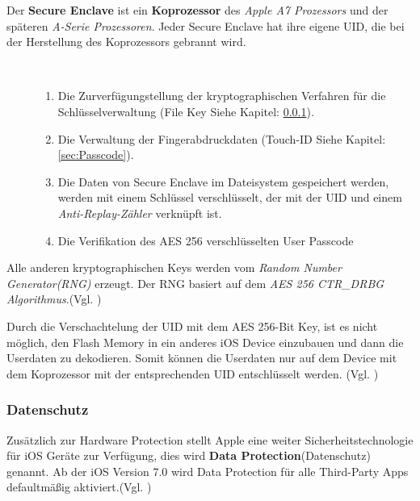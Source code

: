 Der \textbf{Secure Enclave} ist ein \textbf{Koprozessor} des \textit{\glqq Apple A7 Prozessors\grqq{}} und der späteren \textit{\glqq A-Serie Prozessoren\grqq}. Jeder Secure Enclave hat ihre eigene UID, die bei der Herstellung des Koprozessors gebrannt wird.

\begin{description}
     \item[\parbox{\textwidth} {Die Secure Enclace hat folgende Aufgaben}]~\par
    \begin{enumerate}
        \item Die Zurverfügungstellung der kryptographischen Verfahren für die Schlüsselverwaltung (File Key Siehe Kapitel: \ref{sec:DataProtection}).
       \item Die Verwaltung der Fingerabdruckdaten (Touch-ID Siehe Kapitel: \ref{sec:Passcode}).
       \item Die Daten von Secure Enclave im Dateisystem gespeichert werden, werden mit einem Schlüssel verschlüsselt, der mit der UID und einem \textit{\glqq Anti-Replay-Zähler\grqq{}} verknüpft ist.
       \item Die Verifikation des AES 256 verschlüsselten User Passcode
    \end{enumerate}   
\end{description} 

Alle anderen kryptographischen Keys werden vom \textit{\glqq Random Number Generator(RNG)\grqq{}} erzeugt. Der RNG basiert auf dem \textit{\glqq AES 256 CTR\_DRBG Algorithmus\grqq{}}.(Vgl. \cite{iOSSec[5], iOSSec[2],iOSSec[1], Apple[4], Apple[5], Apple[6], Apple[3]})

Durch die Verschachtelung der UID mit dem AES 256-Bit Key, ist es nicht möglich, den Flash Memory in ein anderes iOS Device einzubauen und dann die Userdaten zu dekodieren. Somit können die Userdaten nur auf dem Device mit dem Koprozessor mit der entsprechenden UID entschlüsselt werden. (Vgl. \cite{iOSSec[5], iOSSec[2],iOSSec[1], Apple[4], Apple[5], Apple[6], Apple[3]})

\subsubsection{Datenschutz}
\label{sec:DataProtection}

Zusätzlich zur Hardware Protection stellt Apple eine weiter Sicherheitstechnologie für iOS Geräte zur Verfügung, dies wird \textbf{Data Protection}(Datenschutz) genannt. Ab der iOS Version 7.0 wird Data Protection für alle Third-Party Apps defaultmäßig aktiviert.(Vgl. \cite{iOSSec[5], iOSSec[2],iOSSec[1], Apple[4], Apple[5], Apple[6], Apple[3]})

